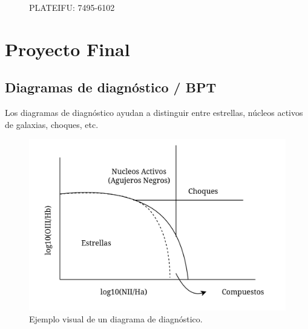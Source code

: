 \documentclass[10pt,twocolumn,a4paper]{opticajnl}
\begin{document}
\begin{figure}
    \caption{PLATEIFU: 7495-6102}
    \label{fig:moreinfo}
\end{figure}

\newpage


\section*{Proyecto Final}

\subsection*{Diagramas de diagnóstico / BPT}
Los diagramas de diagnóstico ayudan a distinguir entre estrellas, núcleos activos de galaxias, choques, etc.

\begin{figure}
  \begin{center}
    \includegraphics[width=1\linewidth]{./diagrama_ejemplo.png}
  \end{center}
  \caption{Ejemplo visual de un diagrama de diagnóstico.}
  \label{fig:diagrama_profe}
\end{figure}
\end{document}
